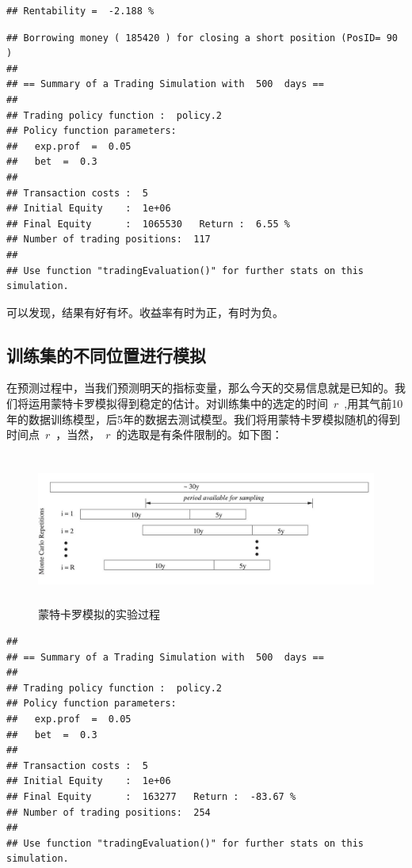 \documentclass{article}\usepackage[]{graphicx}\usepackage[]{color}
\makeatletter
\newenvironment{kframe}{%
 \def\at@end@of@kframe{}%
 \ifinner\ifhmode%
  \def\at@end@of@kframe{\end{minipage}}%
  \begin{minipage}{\columnwidth}%
 \fi\fi%
 \def\FrameCommand##1{\hskip\@totalleftmargin \hskip-\fboxsep
 \colorbox{shadecolor}{##1}\hskip-\fboxsep
     \hskip-\linewidth \hskip-\@totalleftmargin \hskip\columnwidth}%
 \MakeFramed {\advance\hsize-\width
   \@totalleftmargin\z@ \linewidth\hsize
   \@setminipage}}%
 {\par\unskip\endMakeFramed%
 \at@end@of@kframe}
\newenvironment{knitrout}{}{} %
\makeatother
\begin{document}
\begin{CJK*}{UTF8}{gkai}
\begin{knitrout}
\begin{kframe}\begin{verbatim}
## Rentability =  -2.188 %
\end{verbatim}
\end{kframe}
\end{knitrout}
\begin{knitrout}
\color{fgcolor}\begin{kframe}
\begin{verbatim}
## Borrowing money ( 185420 ) for closing a short position (PosID= 90 )
## 
## == Summary of a Trading Simulation with  500  days ==
## 
## Trading policy function :  policy.2 
## Policy function parameters:
## 	 exp.prof  =  0.05 
## 	 bet  =  0.3 
## 
## Transaction costs :  5 
## Initial Equity    :  1e+06 
## Final Equity      :  1065530   Return :  6.55 %
## Number of trading positions:  117 
## 
## Use function "tradingEvaluation()" for further stats on this simulation.
\end{verbatim}
\end{kframe}
\end{knitrout}

可以发现，结果有好有坏。收益率有时为正，有时为负。
\subsection{训练集的不同位置进行模拟}
在预测过程中，当我们预测明天的指标变量，那么今天的交易信息就是已知的。我们将运用蒙特卡罗模拟得到稳定的估计。对训练集中的选定的时间~$r$~,用其气前10年的数据训练模型，后5年的数据去测试模型。我们将用蒙特卡罗模拟随机的得到时间点~$r$~，当然，~$r$~的选取是有条件限制的。如下图：
\begin{figure}[ht]
\centering
\includegraphics[width = 12cm, height = 5cm]{./moto.jpeg}
\caption{蒙特卡罗模拟的实验过程}
\end{figure}
\begin{knitrout}
\color{fgcolor}\begin{kframe}
\begin{verbatim}
## 
## == Summary of a Trading Simulation with  500  days ==
## 
## Trading policy function :  policy.2 
## Policy function parameters:
## 	 exp.prof  =  0.05 
## 	 bet  =  0.3 
## 
## Transaction costs :  5 
## Initial Equity    :  1e+06 
## Final Equity      :  163277   Return :  -83.67 %
## Number of trading positions:  254 
## 
## Use function "tradingEvaluation()" for further stats on this simulation.
\end{verbatim}
\end{kframe}


\end{knitrout}
\end{CJK*}
\end{document}
